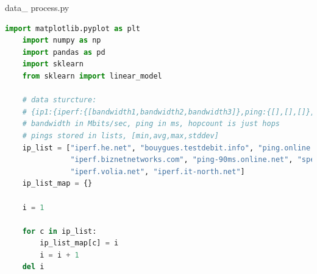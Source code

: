 \documentclass[paper=a4, fontsize=10pt]{scrartcl} %
\numberwithin{equation}{section} %
\numberwithin{figure}{section} %
\numberwithin{table}{section} %
\begin{document}
data\_ process.py
\begin{lstlisting}[language = python]
    import matplotlib.pyplot as plt
    import numpy as np
    import pandas as pd
    import sklearn
    from sklearn import linear_model
    
    # data sturcture:
    # {ip1:{iperf:{[bandwidth1,bandwidth2,bandwidth3]},ping:{[],[],[]},hopcount:{}}, ip2:{...}, ...}
    # bandwidth in Mbits/sec, ping in ms, hopcount is just hops
    # pings stored in lists, [min,avg,max,stddev]
    ip_list = ["iperf.he.net", "bouygues.testdebit.info", "ping.online.net", "st2.nn.ertelecom.ru",
               "iperf.biznetnetworks.com", "ping-90ms.online.net", "speedtest.serverius.net", "bouygues.iperf.fr",
               "iperf.volia.net", "iperf.it-north.net"]
    ip_list_map = {}
    
    i = 1
    
    for c in ip_list:
        ip_list_map[c] = i
        i = i + 1
    del i
    

\end{lstlisting}
\end{document}
